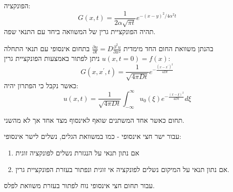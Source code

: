 \documentclass{tstextbook}
\begin{document}
\begin{remark}
הפונקציה:
$$G(x,t)=\frac{1}{2\alpha \sqrt{ \pi t }}e^{ -(x-y)^{2} /4\alpha^{2}t}$$
תהיה הפונקציית גרין של המשוואה ביחד עם התנאי שפה. 

\end{remark}
\begin{corollary}
בהנתן משוואת החום החד מימדית \(\frac{\partial u}{\partial t}=D\frac{\partial^2 u}{\partial x^2}\) בתחום אינסופי עם תנאי התחלה \(u(x,t=0)=f(x)\) ניתן לפתור באמצעות הפונקציית גרין:
$$ G\left(x,x^{\prime},t\right)=\frac1{\sqrt{4\pi Dt}}e^{-\frac{\left(x-x^{\prime}\right)^2}{4Dt}}$$
כאשר נקבל כי הפתרון יהיה:
$$ u\left(x,t\right)=\frac{1}{\sqrt{4\pi Dt}}\int_{-\infty}^{\infty}u_{0}\left(\xi\right)e^{-\frac{\left(x-\xi\right)^{2}}{4Dt}}d\xi $$

\end{corollary}
\begin{definition}
תחום כאשר אחד המשתנים שואף לאינסוף מצד אחד אך לא מהשני.

\end{definition}
\begin{proposition}
עבור ישר חצי אינסופי - כמו במשוואת הגלים, נשלים לישר אינסופי:

\end{proposition}
\begin{enumerate}
  \item אם נתון תנאי על הנגזרת נשלים לפונקציה זוגית 


  \item אם נתון תנאי על המיקום נשלים לפונקציה אי זוגית 
ונפתור בעזרת הפונקציית גרין.


\end{enumerate}
עבור תחום חצי אינסופי נוח לפתור בעזרת משוואת לפלס.
\end{document}
